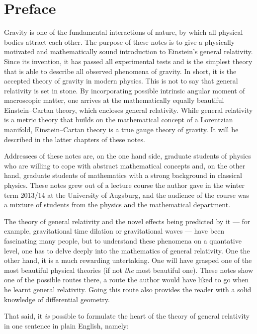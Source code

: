 \chapter*{Preface}

Gravity is one of the fundamental interactions of nature, by which all
physical bodies attract each other. The purpose of these notes is to
give a physically motivated and mathematically sound introduction to
Einstein's general relativity. Since its invention, it has passed all
experimental tests and is the simplest theory that is able to describe
all observed phenomena of gravity. In short, it is the accepted theory
of gravity in modern physics. This is not to say that general relativity
is set in stone. By incorporating possible intrinsic angular moment of
macroscopic  matter, one arrives at the mathematically equally beautiful
Einstein--Cartan theory, which encloses general relativity. While general
relativity is a metric theory that builds on the mathematical concept
of a Lorentzian manifold, Einstein--Cartan theory is a true gauge theory
of gravity. It will be described in the latter chapters of these notes.

Addressees of these notes are, on the one hand side, graduate students
of physics who are willing to cope with abstract mathematical concepts
and, on the other hand, graduate students of mathematics with a strong
background in classical physics. These notes grew out of a lecture
course the author gave in the winter term 2013/14 at the University of
Augsburg, and the audience of the course was a mixture of students from
the physics and the mathematical department.

The theory of general relativity and the novel effects being predicted
by it --- for example, gravitational time dilation or gravitational
waves --- have been fascinating many people, but to understand these
phenomena on a quantative level, one has to delve deeply into the
mathematics of general relativity. One the other hand, it is a much
rewarding untertaking. One will have grasped one of the most beautiful
physical theories (if not \emph{the} most beautiful one). These notes
show one of the possible routes there, a route the author would have
liked to go when he learnt general relativity. Going this route also
provides the reader with a solid knowledge of differential geometry.

That said, it \emph{is} possible to formulate the heart of the theory of
general relativity in one sentence in plain English, namely:

